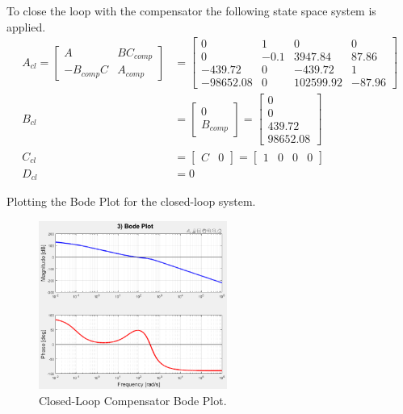 \documentclass[11pt]{article}
\begin{document}
\begin{enumerate}[label=\textbf{\arabic*.}]
  To close the loop with the compensator the following state space system is 
  applied.
  \begin{equation}
    \begin{split}
      A_{cl} =
      \begin{bmatrix}
        A & BC_{comp} \\ -B_{comp}C & A_{comp}
      \end{bmatrix} 
      &=
      \begin{bmatrix}
        0 & 1 & 0 & 0 \\ 
        0 & -0.1 & 3947.84 & 87.86 \\ 
        -439.72 & 0 & -439.72 & 1 \\
        -98652.08 & 0 & 102599.92 & -87.96
      \end{bmatrix} \\
      B_{cl} &= 
      \begin{bmatrix}
        0 \\ B_{comp}
      \end{bmatrix} 
      =
      \begin{bmatrix}
        0 \\ 0 \\ 439.72 \\ 98652.08
      \end{bmatrix} \\
      C_{cl} &=
      \begin{bmatrix}
        C & 0
      \end{bmatrix}
      =
      \begin{bmatrix}
        1 & 0 & 0 & 0
      \end{bmatrix} \\
      D_{cl} &= 0
    \end{split}
  \end{equation}

  Plotting the Bode Plot for the closed-loop system.
  \begin{figure}[H]
    \centering
    \includegraphics[width=0.55\textwidth]{p4.png}
    \caption{Closed-Loop Compensator Bode Plot.}
  \end{figure}


\end{enumerate}
\end{document}
